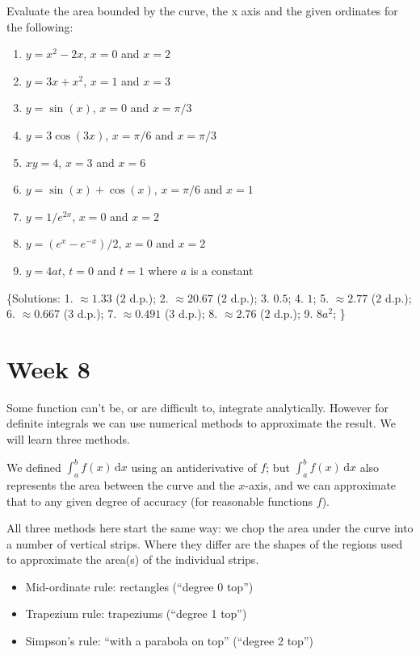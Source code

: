 \documentclass[
  english,
  11pt,
  oneside]{book}
\providecommand{\tightlist}{%
  \setlength{\itemsep}{0pt}\setlength{\parskip}{0pt}}
\newcommand{\slide}{}
\theoremstyle{definition}
\theoremstyle{definition}
\theoremstyle{definition}
\theoremstyle{definition}
\theoremstyle{remark}
\begin{document}
Evaluate the area bounded by the curve, the x axis and the given ordinates for the following:

\begin{enumerate}
\def\labelenumi{\arabic{enumi}.}
\tightlist
\item
  \(y=x^2-2x\), \(x=0\) and \(x=2\)
\item
  \(y=3x+x^2\), \(x=1\) and \(x=3\)
\item
  \(y=\sin(x)\), \(x=0\) and \(x=\pi/3\)
\item
  \(y=3\cos(3x)\), \(x=\pi/6\) and \(x=\pi/3\)
\item
  \(xy=4\), \(x=3\) and \(x=6\)
\item
  \(y=\sin(x)+\cos(x)\), \(x=\pi/6\) and \(x=1\)
\item
  \(y=1/e^{2x}\), \(x=0\) and \(x=2\)
\item
  \(y=(e^x-e^{-x})/2\), \(x=0\) and \(x=2\)
\item
  \(y=4at\), \(t=0\) and \(t=1\) where \(a\) is a constant
\end{enumerate}

\{Solutions:
1. \(\approx 1.33\) (\(2\) d.p.);
2. \(\approx 20.67\) (\(2\) d.p.);
3. \(0.5\);
4. \(1\);
5. \(\approx 2.77\) (\(2\) d.p.);
6. \(\approx 0.667\) (\(3\) d.p.);
7. \(\approx 0.491\) (\(3\) d.p.);
8. \(\approx 2.76\) (\(2\) d.p.);
9. \(8a^2\);
\}

\chapter{Week 8}\label{week-eight}

Some function can't be, or are difficult to, integrate analytically. However for definite integrals we can use numerical methods to approximate the result. We will learn three methods.

\slide

We defined \(\displaystyle\int_a^bf(x)\,\mathrm{d}x\) using an antiderivative of \(f\); but \(\displaystyle\int_a^bf(x)\,\mathrm{d}x\) also represents the area between the curve and the \(x\)-axis, and we can approximate that to any given degree of accuracy (for reasonable functions \(f\)).

All three methods here start the same way: we chop the area under the curve into a number of vertical strips. Where they differ are the shapes of the regions used to approximate the area(s) of the individual strips.

\begin{itemize}
\tightlist
\item
  Mid-ordinate rule: rectangles (``degree 0 top'')
\item
  Trapezium rule: trapeziums (``degree 1 top'')
\item
  Simpson's rule: ``with a parabola on top'' (``degree 2 top'')
\end{itemize}
\end{document}
